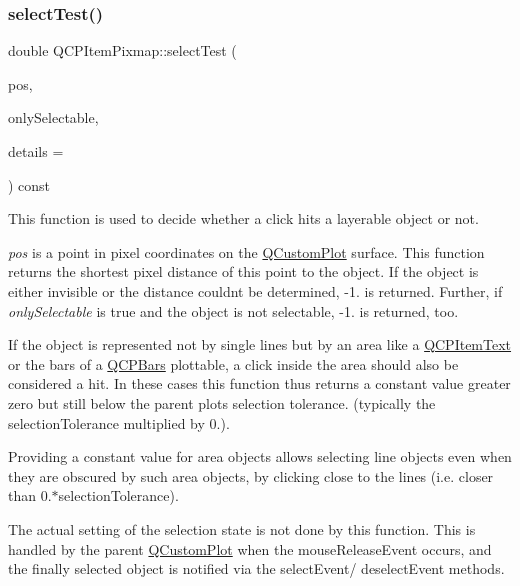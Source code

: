 \subsubsection{\texorpdfstring{selectTest()}{selectTest()}}
{\footnotesize\ttfamily double Q\+C\+P\+Item\+Pixmap\+::select\+Test (\begin{DoxyParamCaption}\item[{const Q\+PointF \&}]{pos,  }\item[{bool}]{only\+Selectable,  }\item[{Q\+Variant $\ast$}]{details = {} }\end{DoxyParamCaption}) const\hspace{0.3cm}{\ttfamily [virtual]}}

This function is used to decide whether a click hits a layerable object or not.

{\itshape pos} is a point in pixel coordinates on the \mbox{\hyperlink{class_q_custom_plot}{Q\+Custom\+Plot}} surface. This function returns the shortest pixel distance of this point to the object. If the object is either invisible or the distance couldn\textquotesingle{}t be determined, -\/1. is returned. Further, if {\itshape only\+Selectable} is true and the object is not selectable, -\/1. is returned, too.

If the object is represented not by single lines but by an area like a \mbox{\hyperlink{class_q_c_p_item_text}{Q\+C\+P\+Item\+Text}} or the bars of a \mbox{\hyperlink{class_q_c_p_bars}{Q\+C\+P\+Bars}} plottable, a click inside the area should also be considered a hit. In these cases this function thus returns a constant value greater zero but still below the parent plot\textquotesingle{}s selection tolerance. (typically the selection\+Tolerance multiplied by 0.).

Providing a constant value for area objects allows selecting line objects even when they are obscured by such area objects, by clicking close to the lines (i.\+e. closer than 0.$\ast$selection\+Tolerance).

The actual setting of the selection state is not done by this function. This is handled by the parent \mbox{\hyperlink{class_q_custom_plot}{Q\+Custom\+Plot}} when the mouse\+Release\+Event occurs, and the finally selected object is notified via the select\+Event/ deselect\+Event methods.


